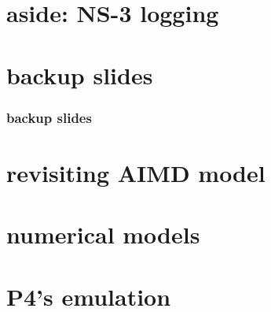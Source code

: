 \section{aside: NS-3 logging}






\section{backup slides}
\begin{frame}\frametitle{backup slides}
\end{frame}


\section{revisiting AIMD model}



\section{numerical models}



\section{P4's emulation}


